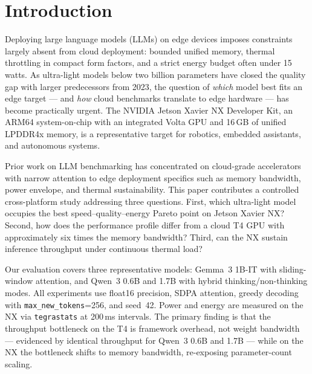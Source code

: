 \documentclass[conference]{IEEEtran}
\begin{document}
\section{Introduction}
Deploying large language models (LLMs) on edge devices imposes constraints largely absent from cloud deployment: bounded unified memory, thermal throttling in compact form factors, and a strict energy budget often under 15\,watts. As ultra-light models below two billion parameters have closed the quality gap with larger predecessors from 2023, the question of \emph{which} model best fits an edge target --- and \emph{how} cloud benchmarks translate to edge hardware --- has become practically urgent. The NVIDIA Jetson Xavier NX Developer Kit, an ARM64 system-on-chip with an integrated Volta GPU and 16\,GB of unified LPDDR4x memory, is a representative target for robotics, embedded assistants, and autonomous systems.

Prior work on LLM benchmarking has concentrated on cloud-grade accelerators with narrow attention to edge deployment specifics such as memory bandwidth, power envelope, and thermal sustainability. This paper contributes a controlled cross-platform study addressing three questions. First, which ultra-light model occupies the best speed--quality--energy Pareto point on Jetson Xavier NX? Second, how does the performance profile differ from a cloud T4 GPU with approximately six times the memory bandwidth? Third, can the NX sustain inference throughput under continuous thermal load?

Our evaluation covers three representative models: Gemma~3 1B-IT \cite{gemma3} with sliding-window attention, and Qwen~3 0.6B and 1.7B \cite{qwen3} with hybrid thinking/non-thinking modes. All experiments use float16 precision, SDPA attention, greedy decoding with \texttt{max\_new\_tokens}=256, and seed~42. Power and energy are measured on the NX via \texttt{tegrastats} at 200\,ms intervals. The primary finding is that the throughput bottleneck on the T4 is framework overhead, not weight bandwidth --- evidenced by identical throughput for Qwen~3 0.6B and 1.7B --- while on the NX the bottleneck shifts to memory bandwidth, re-exposing parameter-count scaling.
\end{document}
